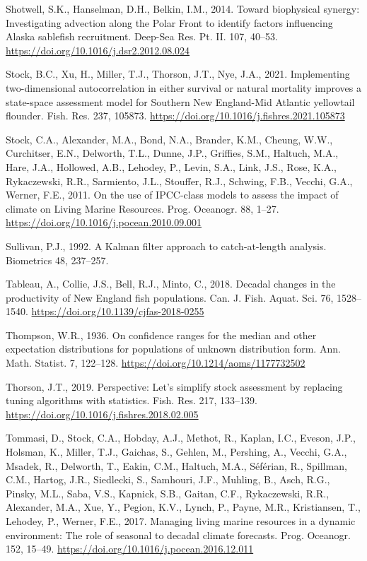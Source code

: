 \documentclass[]{article}
\begin{document}
\leavevmode\hypertarget{ref-shotwell2014Biophysical}{}%
Shotwell, S.K., Hanselman, D.H., Belkin, I.M., 2014. Toward biophysical
synergy: Investigating advection along the Polar Front to identify
factors influencing Alaska sablefish recruitment. Deep-Sea Res. Pt. II.
107, 40--53. \url{https://doi.org/10.1016/j.dsr2.2012.08.024}

\leavevmode\hypertarget{ref-stock2021Implementing}{}%
Stock, B.C., Xu, H., Miller, T.J., Thorson, J.T., Nye, J.A., 2021.
Implementing two-dimensional autocorrelation in either survival or
natural mortality improves a state-space assessment model for Southern
New England-Mid Atlantic yellowtail flounder. Fish. Res. 237, 105873.
\url{https://doi.org/10.1016/j.fishres.2021.105873}

\leavevmode\hypertarget{ref-stock2011Use}{}%
Stock, C.A., Alexander, M.A., Bond, N.A., Brander, K.M., Cheung, W.W.,
Curchitser, E.N., Delworth, T.L., Dunne, J.P., Griffies, S.M., Haltuch,
M.A., Hare, J.A., Hollowed, A.B., Lehodey, P., Levin, S.A., Link, J.S.,
Rose, K.A., Rykaczewski, R.R., Sarmiento, J.L., Stouffer, R.J., Schwing,
F.B., Vecchi, G.A., Werner, F.E., 2011. On the use of IPCC-class models
to assess the impact of climate on Living Marine Resources. Prog.
Oceanogr. 88, 1--27. \url{https://doi.org/10.1016/j.pocean.2010.09.001}

\leavevmode\hypertarget{ref-sullivan1992Kalman}{}%
Sullivan, P.J., 1992. A Kalman filter approach to catch-at-length
analysis. Biometrics 48, 237--257.

\leavevmode\hypertarget{ref-tableau2018Decadal}{}%
Tableau, A., Collie, J.S., Bell, R.J., Minto, C., 2018. Decadal changes
in the productivity of New England fish populations. Can. J. Fish.
Aquat. Sci. 76, 1528--1540.
\url{https://doi.org/10.1139/cjfas-2018-0255}

\leavevmode\hypertarget{ref-thompson1936Confidence}{}%
Thompson, W.R., 1936. On confidence ranges for the median and other
expectation distributions for populations of unknown distribution form.
Ann. Math. Statist. 7, 122--128.
\url{https://doi.org/10.1214/aoms/1177732502}

\leavevmode\hypertarget{ref-thorson2019Perspective}{}%
Thorson, J.T., 2019. Perspective: Let's simplify stock assessment by
replacing tuning algorithms with statistics. Fish. Res. 217, 133--139.
\url{https://doi.org/10.1016/j.fishres.2018.02.005}

\leavevmode\hypertarget{ref-tommasi2017Managing}{}%
Tommasi, D., Stock, C.A., Hobday, A.J., Methot, R., Kaplan, I.C.,
Eveson, J.P., Holsman, K., Miller, T.J., Gaichas, S., Gehlen, M.,
Pershing, A., Vecchi, G.A., Msadek, R., Delworth, T., Eakin, C.M.,
Haltuch, M.A., Séférian, R., Spillman, C.M., Hartog, J.R., Siedlecki,
S., Samhouri, J.F., Muhling, B., Asch, R.G., Pinsky, M.L., Saba, V.S.,
Kapnick, S.B., Gaitan, C.F., Rykaczewski, R.R., Alexander, M.A., Xue,
Y., Pegion, K.V., Lynch, P., Payne, M.R., Kristiansen, T., Lehodey, P.,
Werner, F.E., 2017. Managing living marine resources in a dynamic
environment: The role of seasonal to decadal climate forecasts. Prog.
Oceanogr. 152, 15--49.
\url{https://doi.org/10.1016/j.pocean.2016.12.011}
\end{document}
